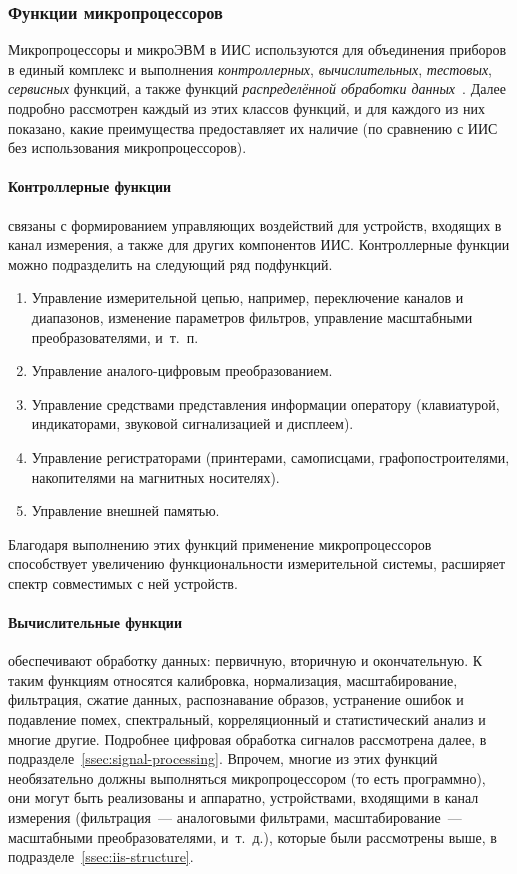\documentclass[a4paper, 14pt, titlepage]{extarticle}
\newcommand{\term}[1]{\emph{#1}}
\let\oldparagraph\paragraph
\renewcommand{\paragraph}[1]{\oldparagraph{\indent #1}}
\begin{document}
  \subsubsection{Функции микропроцессоров}\label{sssec:mcu-functions}

  Микропроцессоры и микроЭВМ в ИИС используются для объединения приборов в единый комплекс и выполнения
  \term{контроллерных}, \term{вычислительных}, \term{тестовых}, \term{сервисных} функций, а также
  функций \term{распределённой обработки данных}~\cite[с.~421]{rannev-meas-tech}.
  Далее подробно рассмотрен каждый из этих классов функций, и для каждого из них показано, какие
  преимущества предоставляет их наличие (по сравнению с ИИС без использования микропроцессоров).

  \paragraph{Контроллерные функции} связаны с формированием управляющих воздействий для устройств,
  входящих в канал измерения, а также для других компонентов ИИС. Контроллерные функции можно
  подразделить на следующий ряд подфункций.
  \begin{enumerate}
    \item Управление измерительной цепью, например, переключение каналов и диапазонов, изменение
      параметров фильтров, управление масштабными преобразователями, и~т.~п.
    \item Управление аналого-цифровым преобразованием.
    \item Управление средствами представления информации оператору (клавиатурой, индикаторами,
      звуковой сигнализацией и дисплеем).
    \item Управление регистраторами (принтерами, самописцами, графопостроителями,
      накопителями на магнитных носителях).
    \item Управление внешней памятью.
  \end{enumerate}

  Благодаря выполнению этих функций применение микропроцессоров способствует увеличению
  функциональности измерительной системы, расширяет спектр совместимых с ней устройств.

  \paragraph{Вычислительные функции} обеспечивают обработку данных: первичную, вторичную и
  окончательную. К таким функциям относятся калибровка, нормализация, масштабирование, фильтрация,
  сжатие данных, распознавание образов, устранение ошибок и подавление помех, спектральный,
  корреляционный и статистический анализ и многие другие. Подробнее цифровая обработка сигналов
  рассмотрена далее, в подразделе~\ref{ssec:signal-processing}. Впрочем, многие из этих функций
  необязательно должны выполняться микропроцессором (то есть программно), они могут быть реализованы
  и аппаратно, устройствами, входящими в канал измерения (фильтрация~--- аналоговыми фильтрами,
  масштабирование~--- масштабными преобразователями, и~т.~д.), которые были рассмотрены выше, в
  подразделе~\ref{ssec:iis-structure}.
\end{document}
